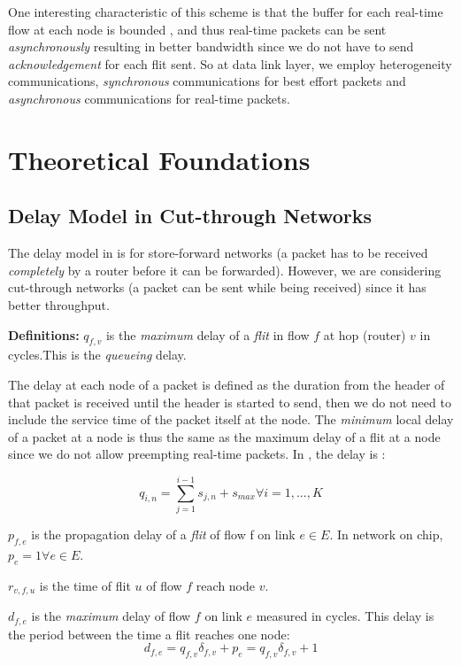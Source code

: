 \documentclass[a4]{article}
\begin{document}
One interesting characteristic of this scheme is that the buffer for each 
real-time flow at each node is bounded \cite{Ferrari90ascheme}, and thus
real-time packets can be sent {\em asynchronously} resulting in better bandwidth
since we do not have to send {\em acknowledgement} for each flit sent. So at
data link layer, we employ heterogeneity communications, {\em synchronous}
communications for best effort packets and {\em asynchronous} communications
for real-time packets.

\section{Theoretical Foundations}
\subsection{Delay Model in Cut-through Networks}

The delay model in \cite{Ferrari90ascheme, VermaJitter91} is
for store-forward networks \cite{DallyPrinNetwork} (a packet has to be
received {\em completely} by a router before it can be forwarded). However, we
are considering cut-through networks (a packet can be sent while being
received) since it has better throughput.

{\textbf{Definitions:}}
$q_{f,v}$ is the {\em maximum} delay of a {\em flit} in flow $f$ at
hop (router) $v$ in cycles.This is the {\em queueing} delay.

The delay at each node of a packet is defined as the duration from the header
of that  packet is received until the header is started to send, then we do not
need to include the service time of the packet itself at the node. The {\em
minimum} local delay of a packet at a node is thus the same as the maximum
delay of a flit at a node since we do not allow preempting real-time packets. In
\cite{Ferrari90ascheme}, the delay is :

\begin{equation}\label{equ:nodedelay1}
q_{i,n} = \sum_{j=1}^{i-1}s_{j,n}+s_{max} \forall i = 1, ..., K
\end{equation}

 
$p_{f,e}$ is the propagation delay of a {\em flit} of flow f on link $e
\in E$. In network on chip, $p_e=1 \forall e \in E$.

$r_{v,f,u}$ is the time of flit $u$ of flow $f$ reach node $v$.  

$d_{f,e}$ is the {\em maximum} delay of flow $f$ on link $e$ measured in
cycles. This delay is the period between the time a flit reaches one node:
\begin{equation}\label{equ:edgeDelay}
d_{f,e} = q_{f,v}\delta_{f,v} + p_{e} = q_{f,v}\delta_{f,v} + 1 
\end{equation}
\end{document}
